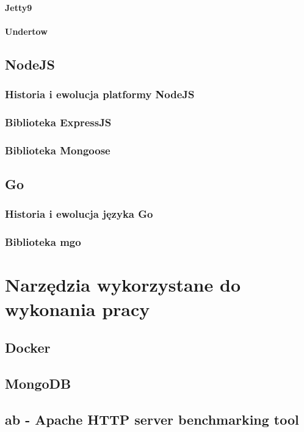 \documentclass[a4paper,12pt,twoside,openany]{report}
\begin{document}
\subsubsection{Jetty9}
\subsubsection{Undertow}

\section{NodeJS}
\subsection{Historia i ewolucja platformy NodeJS}
\subsection{Biblioteka ExpressJS}
\subsection{Biblioteka Mongoose}

\section{Go}
\subsection{Historia i ewolucja języka Go}
\subsection{Biblioteka mgo}

\chapter{Narzędzia wykorzystane do wykonania pracy}
\section{Docker}
\section{MongoDB}
\section{ab - Apache HTTP server benchmarking tool}
\end{document}
